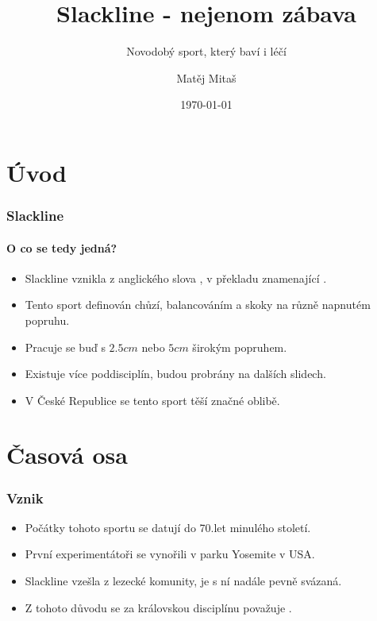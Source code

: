 \documentclass{beamer}
\title[Slackline]
{Slackline - nejenom zábava}
\subtitle{Novodobý sport, který baví i léčí}
\author{Matěj Mitaš}
\date{\today} %
\begin{document}

\begin{frame}
  \titlepage
\end{frame}


\section{Úvod}

\begin{frame}
  \frametitle{Slackline}
  \framesubtitle{O co se tedy jedná?}
  
  \begin{itemize}
		\item Slackline vznikla z anglického slova , v překladu znamenající .
		\item Tento sport definován chůzí, balancováním a skoky na různě napnutém popruhu.
		\item Pracuje se buď s $2.5cm$ nebo $5cm$ širokým popruhem.
		\item Existuje více poddisciplín, budou probrány na dalších slidech.
		\item V České Republice se tento sport těší značné oblibě.
	\end{itemize}
\end{frame}

\section{Časová osa}

\begin{frame}
  \frametitle{Vznik}
  
    \begin{itemize}
		\item Počátky tohoto sportu se datují do 70.let minulého století.
		\item První experimentátoři se vynořili v parku Yosemite v USA.
		\item Slackline vzešla z lezecké komunity, je s ní nadále pevně svázaná.
		\item Z tohoto důvodu se za královskou disciplínu považuje .
	\end{itemize}
\end{frame}
\end{document}
